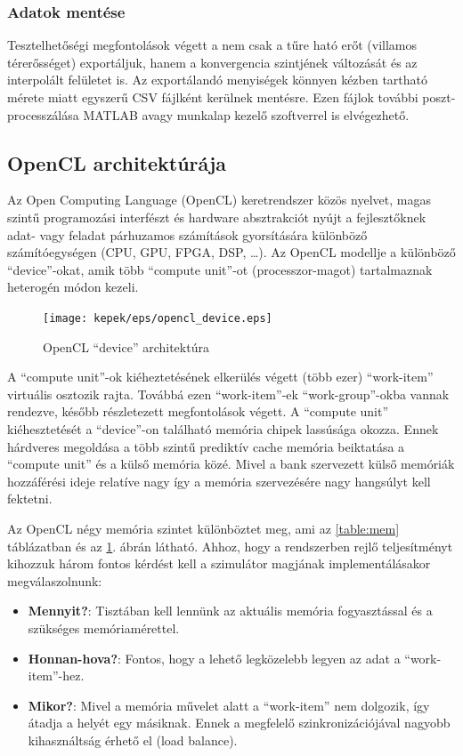 		\subsubsection{Adatok mentése}
		Tesztelhetőségi megfontolások végett a nem csak a tűre ható erőt (villamos
		térerősséget) exportáljuk, hanem a konvergencia szintjének változását és az
		interpolált felületet is. Az exportálandó menyiségek könnyen kézben tartható
		mérete miatt egyszerű CSV fájlként kerülnek mentésre. Ezen fájlok további
		poszt-processzálása MATLAB avagy munkalap kezelő szoftverrel is elvégezhető.
		
	
	\subsection{OpenCL architektúrája}
		Az Open Computing Language (OpenCL) keretrendszer \cite{opencl} közös
		nyelvet, magas szintű programozási interfészt és hardware absztrakciót nyújt a fejlesztőknek
		adat- vagy feladat párhuzamos számítások gyorsítására különböző
		számítóegységen (CPU, GPU, FPGA, DSP, \ldots).
		Az OpenCL modellje a különböző ``device''-okat, amik több ``compute unit''-ot
		(processzor-magot) tartalmaznak heterogén módon kezeli. 
		
		\begin{figure}[!ht]
			\centering
			\texttt{[image: kepek/eps/opencl\_device.eps]}
			\caption{\scriptsize OpenCL ``device'' architektúra \cite{opencl}} 
			\label{fig:device} 
		\end{figure}
		
		A ``compute unit''-ok kiéheztetésének elkerülés végett (több ezer)
		``work-item'' virtuális osztozik rajta.
		Továbbá ezen ``work-item''-ek ``work-group''-okba vannak rendezve, később
		részletezett megfontolások végett.
		A ``compute unit'' kiéhesztetését a ``device''-on található memória chipek lassúsága okozza.
		Ennek hárdveres megoldása a több szintű prediktív cache memória beiktatása a
		``compute unit'' és a külső memória közé.
		Mivel a bank szervezett külső memóriák hozzáférési ideje relatíve nagy
		így a memória szervezésére nagy hangsúlyt kell fektetni.
		
		Az OpenCL négy memória szintet különböztet meg, ami az
		\ref{table:mem} táblázatban és az \ref{fig:device}. ábrán látható.
		Ahhoz, hogy a rendszerben rejlő teljesítményt kihozzuk három fontos kérdést
		kell a szimulátor magjának implementálásakor megválaszolnunk:
		\begin{itemize}
			\item \textbf{Mennyit?}: Tisztában kell lennünk az aktuális
			memória fogyasztással és a szükséges memóriamérettel.
			\item \textbf{Honnan-hova?}: Fontos, hogy a lehető legközelebb legyen az adat
			a ``work-item''-hez.
			\item \textbf{Mikor?}: Mivel a memória művelet alatt a ``work-item'' nem
			dolgozik, így átadja a helyét egy másiknak. Ennek a megfelelő
			szinkronizációjával nagyobb kihasználtság érhető el (load balance).
		\end{itemize}
		
